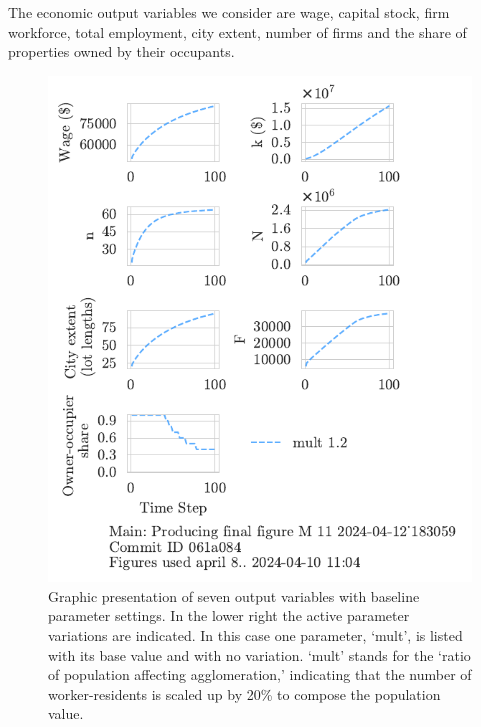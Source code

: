 The economic output variables we consider are wage, capital stock, firm workforce, total employment, city extent, number of firms and the share of properties owned by their occupants. 
\begin{figure}[h!t]
\centering
\includegraphics[scale=1.0, trim={0 1.4cm 0 0},clip]{fig/plain-for-intro_183059.pdf}
\caption[Graphic presentation of seven output variables]{Graphic presentation of seven output variables with baseline parameter settings. In the lower right the active parameter variations are indicated. In this case one parameter, `mult', is listed with its base value and with no variation.  `mult' stands for the `ratio of population affecting agglomeration,' indicating that the number of worker-residents is scaled up by 20\% to compose the population value.}
\label{fig:plain-for-intro}
\end{figure}
